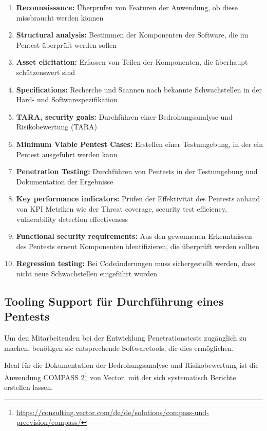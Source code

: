 \begin{enumerate}
    \item \textbf{Reconnaissance:} Überprüfen von Featuren der Anwendung, ob diese missbraucht werden können
    \item \textbf{Structural analysis:} Bestimmen der Komponenten der Software, die im Pentest überprüft werden sollen
    \item \textbf{Asset elicitation:} Erfassen von Teilen der Komponenten, die überhaupt schützenswert sind
    \item \textbf{Specifications:} Recherche und Scannen nach bekannte Schwachstellen in der Hard- und Softwarespezifikation
    \item \textbf{TARA, security goals:} Durchführen einer Bedrohungsanalyse und Risikobewertung (TARA)
    \item \textbf{Minimum Viable Pentest Cases:} Erstellen einer Testumgebung, in der ein Pentest ausgeführt werden kann
    \item \textbf{Penetration Testing:} Durchführen von Pentests in der Testumgebung und Dokumentation der Ergebnisse
    \item \textbf{Key performance indicators:} Prüfen der Effektivität des Pentests anhand von KPI Metriken wie der Threat coverage, security test efficiency, vulnerability detection effectiveness
    \item \textbf{Functional security requirements:} Aus den gewonnenen Erkenntnissen des Pentests erneut Komponenten identifizieren, die überprüft werden sollten
    \item \textbf{Regression testing:} Bei Codeänderungen muss sichergestellt werden, dass nicht neue Schwachstellen eingeführt wurden
\end{enumerate}

\subsection{Tooling Support für Durchführung eines Pentests}\label{subsec:fallbeispiel}

Um den Mitarbeitenden bei der Entwicklung Penetrationstests zugänglich zu machen, benötigen sie entsprechende Softwaretools, die dies ermöglichen. 

Ideal für die Dokumentation der Bedrohungsanalyse und Risikobewertung ist die Anwendung COMPASS 2\footnote{\url{https://consulting.vector.com/de/de/solutions/compass-und-preevision/compass/}} von Vector, mit der sich systematisch Berichte erstellen lassen.

